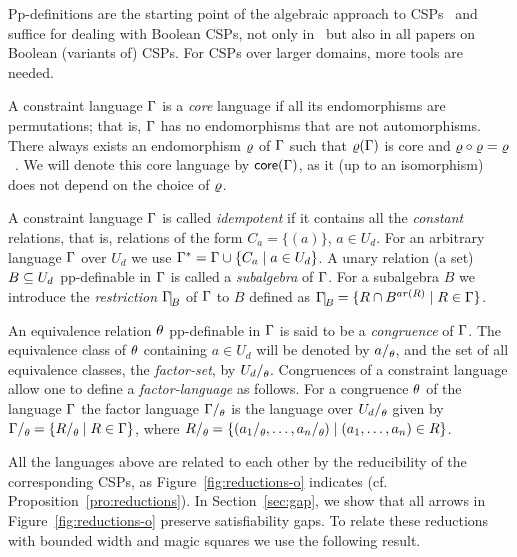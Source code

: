 \documentclass[11pt,letter]{article}
\begin{document}
\smallskip

Pp-definitions are the starting point of the algebraic approach to
CSPs~\cite{Bulatov05:classifying} and suffice for dealing with Boolean CSPs,
not only in~\cite{AKS19:jcss} but also in all papers on Boolean (variants of) CSPs. For
CSPs over larger domains, more tools are needed.

A constraint language $\Gamma$ is a \emph{core} language if all its endomorphisms
are permutations; that is, $\Gamma$ has no endomorphisms that are not
automorphisms. There always exists an endomorphism $\varrho$ of $\Gamma$ such that $\varrho(\Gamma)$ is
core and $\varrho\circ\varrho=\varrho$~\cite{Bulatov05:classifying}. We will denote this core language by $\mathsf{core}(\Gamma)$, as it (up to an isomorphism) does not depend on the choice of $\varrho$.

A constraint language $\Gamma$ is called \emph{idempotent} if it contains all the
\emph{constant} relations, that is, relations of the form $C_a=\{(a)\}$, $a\in
U_d$. For an arbitrary language $\Gamma$ over $U_d$ we use $\Gamma^*=\Gamma\cup\{C_a\mid
a\in U_d\}$.  A unary relation (a set) $B\subseteq U_d$ pp-definable in $\Gamma$ is
called a \emph{subalgebra} of $\Gamma$. For a subalgebra $B$ we introduce the
\emph{restriction} $\Gm\red B$ of $\Gamma$ to $B$ defined as $\Gm\red B=\{\rel\cap
B^{ar(\rel)}\mid \rel\in\Gm\}$.

An equivalence relation $\theta$ pp-definable in $\Gamma$ is said to be a \emph{congruence} of $\Gamma$. The equivalence class of $\theta$ containing $a\in U_d$ will be denoted by $a\fac\th$, and the set of all equivalence classes, the \emph{factor-set}, by $U_d\fac\th$. Congruences of a constraint language allow one to define a \emph{factor-language} as follows. For a congruence $\theta$ of the language $\Gamma$ the factor language $\Gm\fac\th$ is the language over $U_d\fac\th$ given by $\Gm\fac\th=\{\rel\fac\th\mid \rel\in\Gm\}$, where $\rel\fac\th=\{(a_1\fac\th\zd a_n\fac\th)\mid  (\vc an)\in\rel\}$.

All the languages above are related to each other 
by the reducibility of the corresponding CSPs, as Figure~\ref{fig:reductions-o}
indicates (cf. Proposition~\ref{pro:reductions}).
In Section~\ref{sec:gap}, we show that all arrows in
Figure~\ref{fig:reductions-o} preserve satisfiability gaps.
To relate these reductions with bounded width and magic squares we use the
following result.
\end{document}

